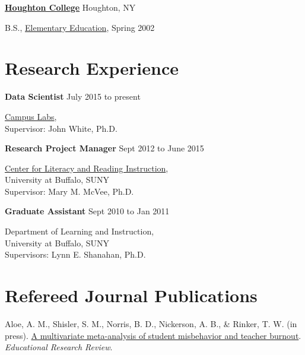 \href{http://www.houghton.edu/}{\textbf{Houghton College}}
Houghton, NY
\begin{outerlist}

\item[] B.S.,
        \href{http://www.houghton.edu/education/}
             {Elementary Education},
             Spring 2002
\end{outerlist}
\vspace{.1in}


\section{Research Experience}

\textbf{Data Scientist} \hfill {July 2015 to present}
\begin{innerlist}

\item[] \href{http://www.campuslabs.com}{Campus Labs},\\
        Supervisor: John White, Ph.D.
\end{innerlist}


\textbf{Research Project Manager} \hfill {Sept 2012 to June 2015}
\begin{innerlist}

\item[] \href{http://clari.buffalo.edu}{Center for Literacy and Reading Instruction},\\
        University at Buffalo, SUNY\\
        Supervisor: Mary M. McVee, Ph.D.
\end{innerlist}

\textbf{Graduate Assistant} \hfill {Sept 2010 to Jan 2011}
\begin{innerlist}

\item[] Department of Learning and Instruction,\\
        University at Buffalo, SUNY\\
        Supervisors: Lynn E. Shanahan, Ph.D.
\end{innerlist}

\section{Refereed Journal Publications}
\vspace{-.1275in}
\begin{bibsection}
    \item Aloe, A. M., Shisler, S. M., Norris, B. D., Nickerson, A. B., \& Rinker, T. W. (in press). \href{http://www.sciencedirect.com/science/article/pii/S1747938X14000141}{A multivariate meta-analysis of student misbehavior and teacher burnout}. \emph{Educational Research Review}.
\end{bibsection}
\halfblankline

